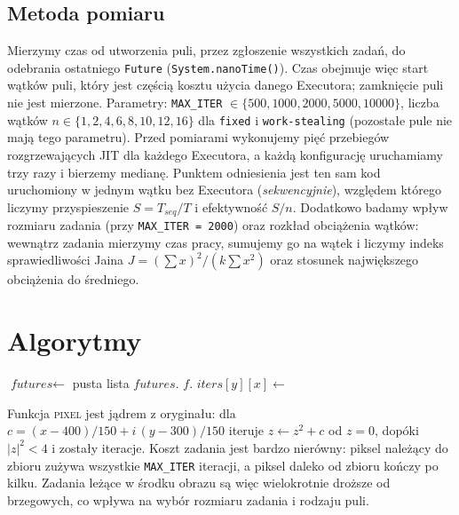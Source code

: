 \documentclass[11pt,a4paper]{article}
\newenvironment{algorytm}[1][htb]
  {\par\bigskip\floatname{algorithm}{}\renewcommand{\thealgorithm}{}
   \begin{algorithm}[#1]%
  }{\end{algorithm}\par\bigskip}
\begin{document}
\subsection{Metoda pomiaru}
Mierzymy czas od utworzenia puli, przez zgłoszenie wszystkich zadań, do odebrania ostatniego
\texttt{Future} (\texttt{System.nanoTime()}). Czas obejmuje więc start wątków puli, który jest
częścią kosztu użycia danego Executora; zamknięcie puli nie jest mierzone.
Parametry: \texttt{MAX\_ITER} $\in \{500, 1000, 2000, 5000, 10000\}$, liczba wątków
$n \in \{1, 2, 4, 6, 8, 10, 12, 16\}$ dla \texttt{fixed} i \texttt{work-stealing}
(pozostałe pule nie mają tego parametru). Przed pomiarami wykonujemy pięć przebiegów
rozgrzewających JIT dla każdego Executora, a każdą konfigurację uruchamiamy trzy razy i bierzemy medianę.
Punktem odniesienia jest ten sam kod uruchomiony w jednym wątku bez Executora (\textit{sekwencyjnie}),
względem którego liczymy przyspieszenie $S = T_{seq} / T$ i efektywność $S / n$.
Dodatkowo badamy wpływ rozmiaru zadania (przy \texttt{MAX\_ITER = 2000}) oraz rozkład obciążenia
wątków: wewnątrz zadania mierzymy czas pracy, sumujemy go na wątek i liczymy indeks sprawiedliwości
Jaina $J = (\sum x)^2 / (k \sum x^2)$ oraz stosunek największego obciążenia do średniego.

\section{Algorytmy}
\begin{algorytm}[H]
\begin{algorithmic}[1]
     
        \State $\textit{futures} \gets$ pusta lista
            \State $\textit{futures}$.
        \EndFor
            \State $f$. 
        \EndFor
    \EndProcedure
     
            \State $\textit{iters}[y][x] \gets$ 
        \EndFor
    \EndProcedure
\end{algorithmic}
\caption{Podział na zadania i oczekiwanie na Future}
\end{algorytm}

Funkcja \textsc{pixel} jest jądrem z oryginału: dla $c = (x - 400)/150 + i\,(y - 300)/150$
iteruje $z \gets z^2 + c$ od $z = 0$, dopóki $|z|^2 < 4$ i zostały iteracje.
Koszt zadania jest bardzo nierówny: piksel należący do zbioru zużywa wszystkie \texttt{MAX\_ITER}
iteracji, a piksel daleko od zbioru kończy po kilku. Zadania leżące w środku obrazu są
więc wielokrotnie droższe od brzegowych, co wpływa na wybór rozmiaru zadania i rodzaju puli.
\end{document}
